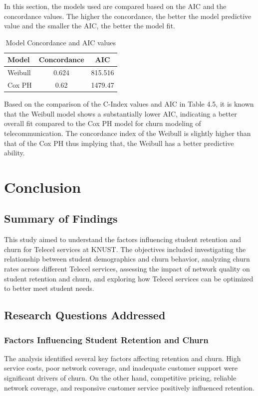 \documentclass[doublespacing]{report} %
\begin{document}
In this section, the models used are compared based on the AIC and the concordance values. The higher the concordance, the better the model predictive value and the smaller the AIC, the better the model fit.

\begin{table}[H]
\centering
\begin{tabular}{lcc}
\toprule
\textbf{Model} & \textbf{Concordance} & \textbf{AIC} \\
\midrule
Weibull & 0.624 & 815.516 \\
Cox PH & 0.62 & 1479.47 \\
\bottomrule
\end{tabular}
\caption{Model Concordance and AIC values}
\end{table}

Based on the comparison of the C-Index values and AIC in Table 4.5, it is known that the Weibull model shows a substantially lower AIC, indicating a better overall fit compared to the Cox PH model for churn modeling of telecommunication. The concordance index of the Weibull is slightly higher than that of the Cox PH thus implying that, the Weibull has a better predictive ability.

\newpage
\chapter{Conclusion}

\section{Summary of Findings}

This study aimed to understand the factors influencing student retention and churn for Telecel services at KNUST. The objectives included investigating the relationship between student demographics and churn behavior, analyzing churn rates across different Telecel services, assessing the impact of network quality on student retention and churn, and exploring how Telecel services can be optimized to better meet student needs.

\section{Research Questions Addressed}

\subsection{Factors Influencing Student Retention and Churn}
The analysis identified several key factors affecting retention and churn. High service costs, poor network coverage, and inadequate customer support were significant drivers of churn. On the other hand, competitive pricing, reliable network coverage, and responsive customer service positively influenced retention.
\end{document}
